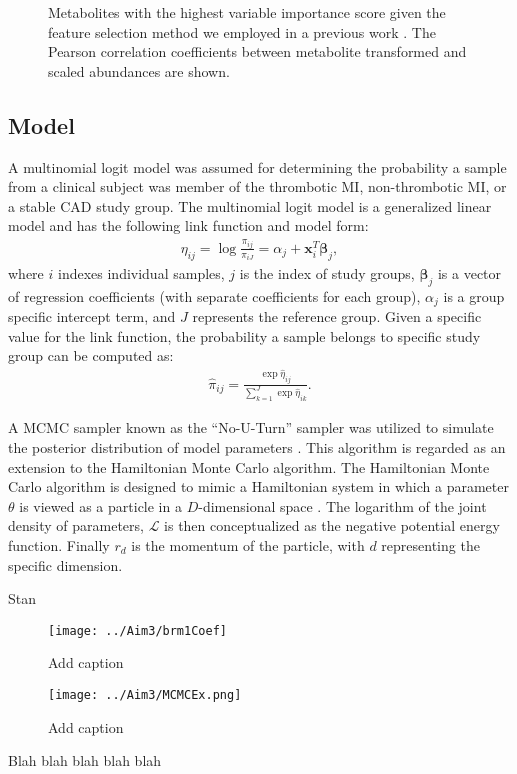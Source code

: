 \begin{figure}[H]
	\caption[Feature selection]{Metabolites with the highest variable importance score given the feature selection method we employed in a previous work \cite{trainor2018}. The Pearson correlation coefficients between metabolite transformed and scaled abundances are shown. \label{fig:include}}
\end{figure}

\begin{DoubleSpace*}
\section{Model}
A multinomial logit model was assumed for determining the  probability a sample from a clinical subject was member of the thrombotic MI, non-thrombotic MI, or a stable CAD study group. The multinomial logit model is a generalized linear model and has the following link function and model form: 
\begin{align}
\eta_{ij} = \log \frac{\pi_{ij}}{\pi_{iJ}} = \alpha_j + \textbf{x}_i^T \boldsymbol{\beta}_j,
\end{align} 
where $i$ indexes individual samples, $j$ is the index of study groups, $\boldsymbol{\beta}_j$ is a vector of regression coefficients (with separate coefficients for each group), $\alpha_j$ is a group specific intercept term, and $J$ represents the reference group. Given a specific value for the link function, the probability a sample belongs to specific study group can be computed as:
\begin{align}
\hat{\pi}_{ij} = \frac{\exp \hat{\eta}_{ij}}{\sum_{k=1}^{J}\exp \hat{\eta}_{ik}}.
\end{align}

A MCMC sampler known as the ``No-U-Turn'' sampler was utilized to simulate the posterior distribution of model parameters \cite{hoffman2014}. This algorithm is regarded as an extension to the Hamiltonian Monte Carlo algorithm. The Hamiltonian Monte Carlo algorithm is designed to mimic a Hamiltonian system in which a parameter $\theta$ is viewed as a particle in a $D$-dimensional space \cite{neal2011}. The logarithm of the joint density of parameters, $\mathcal{L}$ is then conceptualized as the negative potential energy function. Finally $r_d$ is the momentum of the particle, with $d$ representing the specific dimension. 

Stan \cite{carpenter2017}
\end{DoubleSpace*}

\newpage
{}
\recalctypearea
\begin{figure}[H]
\texttt{[image: ../Aim3/brm1Coef]}

	\caption[Add caption]{Add caption \label{fig:brm1Coef} }
\end{figure}
\newpage
\begin{figure}[H]
	\texttt{[image: ../Aim3/MCMCEx.png]}
	\caption[Add caption]{Add caption \label{fig:brm1Coef} }
\end{figure}
\newpage
{}
\recalctypearea

Blah blah blah blah blah 